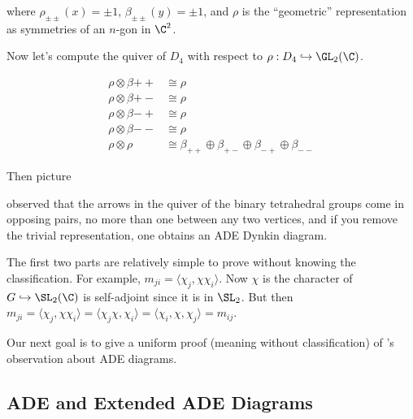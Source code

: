 where $\rho_{\pm\pm}(x)=\pm1$, $\beta_{\pm\pm}(y)=\pm1$, and $\rho$ is the ``geometric'' representation as symmetries of an $n$-gon in $\C^2$.

Now let's compute the \mc quiver of $D_4$ with respect to $\rho: D_4 \hookrightarrow \GL_2(\C)$. 

	
	\[
	\begin{split}
	\rho \otimes \beta{++} &\cong \rho \\
	\rho \otimes \beta{+-} &\cong \rho \\
	\rho \otimes \beta{-+} &\cong \rho \\
	\rho \otimes \beta{--} &\cong \rho \\
	\rho \otimes \rho &\cong \beta_{++} \oplus \beta_{+-} \oplus \beta_{-+} \oplus \beta_{--}
	\end{split}
	\]




Then picture





\mc observed that the arrows in the \mc quiver of the binary tetrahedral groups come in opposing pairs, no more than one between any two vertices, and if you remove the trivial representation, one obtains an ADE Dynkin diagram. 


The first two parts are relatively simple to prove without knowing the classification. For example, $m_{ji}= \langle \chi_j,\chi\chi_i \rangle$. Now $\chi$ is the character of $G \hookrightarrow \SL_2(\C)$ is self-adjoint since it is in $\SL_2$. But then $m_{ji}= \langle \chi_j,\chi\chi_i \rangle= \langle \chi_j\chi,\chi_i \rangle= \langle \chi_i, \chi,\chi_j \rangle=m_{ij}$. 


Our next goal is to give a uniform proof (meaning without classification) of \mc's observation about ADE diagrams. 




\subsection{ADE and Extended ADE Diagrams}


